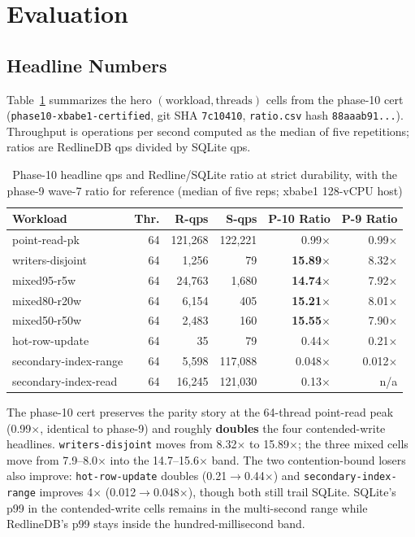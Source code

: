 \section{Evaluation}\label{sec:eval}

\subsection{Headline Numbers}
Table~\ref{tab:headline} summarizes the hero
$(\mathrm{workload}, \mathrm{threads})$ cells from the phase-10 cert
(\texttt{phase10-xbabe1-certified}, git SHA \texttt{7c10410},
\texttt{ratio.csv} hash
\texttt{88aaab91...}). Throughput is operations per second computed as
the median of five repetitions; ratios are RedlineDB qps divided by
SQLite qps.

\begin{table}[t]
\centering
\caption{Phase-10 headline qps and Redline/SQLite ratio at strict
durability, with the phase-9 wave-7 ratio for reference (median of
five reps; xbabe1 128-vCPU host)}
\label{tab:headline}
\renewcommand{\arraystretch}{1.05}
\setlength{\tabcolsep}{3pt}
\footnotesize
\begin{tabular}{@{}lrrrrr@{}}
\toprule
\textbf{Workload} & \textbf{Thr.} & \textbf{R-qps} & \textbf{S-qps}
& \textbf{P-10 Ratio} & \textbf{P-9 Ratio} \\
\midrule
point-read-pk        & 64 & 121{,}268 & 122{,}221 & 0.99$\times$ & 0.99$\times$ \\
writers-disjoint     & 64 &  1{,}256  &      79  & \textbf{15.89$\times$} & 8.32$\times$ \\
mixed95-r5w          & 64 & 24{,}763  & 1{,}680  & \textbf{14.74$\times$} & 7.92$\times$ \\
mixed80-r20w         & 64 &  6{,}154  &     405  & \textbf{15.21$\times$} & 8.01$\times$ \\
mixed50-r50w         & 64 &  2{,}483  &     160  & \textbf{15.55$\times$} & 7.90$\times$ \\
hot-row-update       & 64 &       35  &      79  & 0.44$\times$ & 0.21$\times$ \\
secondary-index-range & 64 & 5{,}598  & 117{,}088 & 0.048$\times$ & 0.012$\times$ \\
secondary-index-read & 64 & 16{,}245  & 121{,}030 & 0.13$\times$ & n/a \\
\bottomrule
\end{tabular}
\end{table}

The phase-10 cert preserves the parity story at the 64-thread
point-read peak (0.99$\times$, identical to phase-9) and roughly
\textbf{doubles} the four contended-write headlines. \texttt{writers-disjoint}
moves from 8.32$\times$ to 15.89$\times$; the three mixed cells move
from 7.9--8.0$\times$ into the 14.7--15.6$\times$ band. The two
contention-bound losers also improve: \texttt{hot-row-update}
doubles (0.21$\rightarrow$0.44$\times$) and
\texttt{secondary-index-range} improves 4$\times$
(0.012$\rightarrow$0.048$\times$), though both still trail SQLite.
SQLite's p99 in the contended-write cells remains in the multi-second
range while RedlineDB's p99 stays inside the hundred-millisecond band.

